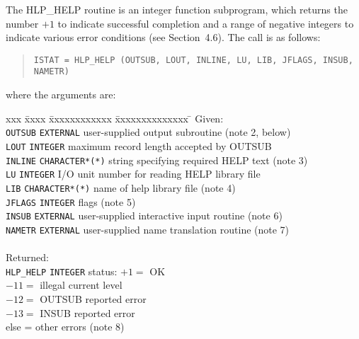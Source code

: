 The HLP\_HELP routine is an integer function subprogram, which
returns the number $+1$ to indicate successful completion and a
range of negative integers to indicate various error conditions
(see Section~4.6).  The call is as follows:
\begin{verse}
\verb|ISTAT = HLP_HELP (OUTSUB, LOUT, INLINE, LU, LIB, JFLAGS, INSUB, NAMETR)|
\end{verse}
where the arguments are:
\begin{tabbing}
xxx \= xxxx \= xxxxxxxxxxxx \= xxxxxxxxxxxxxx \= \kill
\> Given: \\
\> \> \verb|OUTSUB| \> \verb|EXTERNAL| \>
                      user-supplied output subroutine (note 2, below) \\
\> \> \verb|LOUT| \> \verb|INTEGER| \>
                             maximum record length accepted by OUTSUB \\
\> \> \verb|INLINE| \> \verb|CHARACTER*(*)| \>
                        string specifying required HELP text (note 3) \\
\> \> \verb|LU| \> \verb|INTEGER| \>
                        I/O unit number for reading HELP library file \\
\> \> \verb|LIB| \> \verb|CHARACTER*(*)| \>
                                   name of help library file (note 4) \\
\> \> \verb|JFLAGS| \> \verb|INTEGER| \>
                                                       flags (note 5) \\
\> \> \verb|INSUB| \> \verb|EXTERNAL| \>
                     user-supplied interactive input routine (note 6) \\
\> \> \verb|NAMETR| \> \verb|EXTERNAL| \>
                      user-supplied name translation routine (note 7) \\ \\
\> Returned: \\
\> \> \verb|HLP_HELP| \> \verb|INTEGER| \>
                                 status:  $+1=$ OK \\
\> \> \> \> \hspace{2.6em}               $-11=$ illegal current level \\
\> \> \> \> \hspace{2.6em}               $-12=$ OUTSUB reported error \\
\> \> \> \> \hspace{2.6em}               $-13=$ INSUB reported error \\
\> \> \> \> \hspace{2.75em}             else = other errors (note 8)
\end{tabbing}
